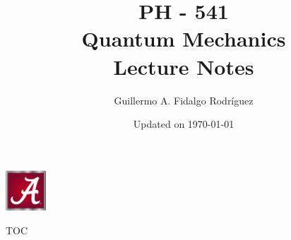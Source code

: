 \documentclass[aspectratio=43,10pt]{beamer}
\title[Lecture Notes]{PH - 541\\ Quantum Mechanics \\Lecture Notes}
\date[\today]{Updated on \today}
\author[G. Fidalgo]{Guillermo A. Fidalgo Rodríguez}
\institute[UA]{University of Alabama}
\begin{document}
\begin{frame}
	\titlepage
	\hfill
	\includegraphics[width=1.5cm]{Images/UA_logo.jpg}
\end{frame}

\begin{frame}{TOC}
	\tableofcontents
\end{frame}


% 
%
%
%
% 
\end{document}
